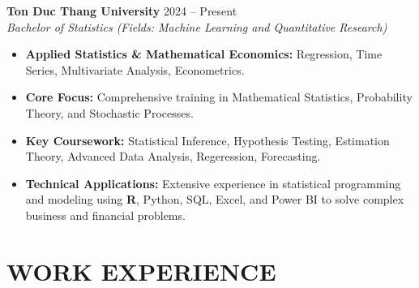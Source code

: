 \documentclass[12pt,a4paper]{article}
\begin{document}
\noindent \textbf{Ton Duc Thang University} \hfill 2024 -- Present \\
\textit{Bachelor of Statistics (Fields: Machine Learning and Quantitative Research)} 
\vspace{8pt}
    \begin{itemize}[leftmargin=*, noitemsep, topsep=0pt]
        \item \textbf{Applied Statistics \& Mathematical Economics:} Regression, Time Series, Multivariate Analysis, Econometrics. 
        
        \item \textbf{Core Focus:} Comprehensive training in Mathematical Statistics, Probability Theory, and Stochastic Processes.
        
        \item \textbf{Key Coursework:} Statistical Inference, Hypothesis Testing, Estimation Theory, Advanced Data Analysis, Regeression, Forecasting.
        
        \item \textbf{Technical Applications:} Extensive experience in statistical programming and modeling using \textbf{R}, Python, SQL, Excel, and Power BI to solve complex business and financial problems.
    \end{itemize}

\section{WORK EXPERIENCE}
\end{document}
